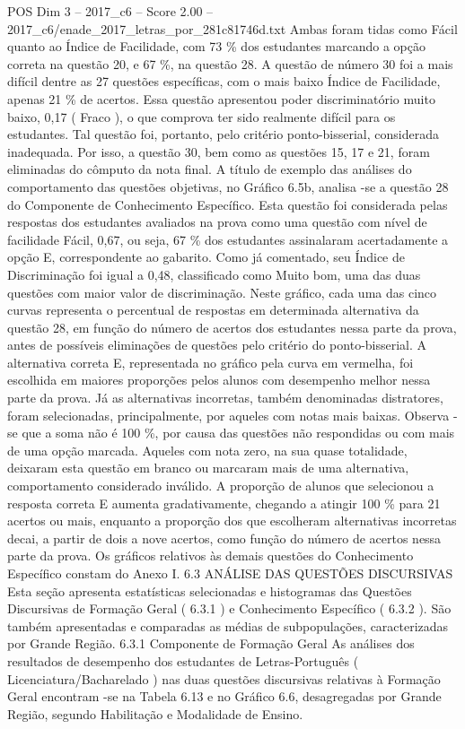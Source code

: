 \begin{textsample}{POS Dim 3 – 2017\_c6 – Score 2.00 – 2017\_c6/enade\_2017\_letras\_por\_281c81746d.txt}
Ambas foram tidas como Fácil quanto ao Índice de Facilidade, com 73 \% dos estudantes marcando a opção correta na questão 20, e 67 \%, na questão 28.
A questão de número 30 foi a mais difícil dentre as 27 questões específicas, com o mais baixo Índice de Facilidade, apenas 21 \% de acertos.
Essa questão apresentou poder discriminatório muito baixo, 0,17 ( Fraco ), o que comprova ter sido realmente difícil para os estudantes.
Tal questão foi, portanto, pelo critério ponto-bisserial, considerada inadequada.
Por isso, a questão 30, bem como as questões 15, 17 e 21, foram eliminadas do cômputo da nota final.
A título de exemplo das análises do comportamento das questões objetivas, no Gráfico 6.5b, analisa -se a questão 28 do Componente de Conhecimento Específico.
Esta questão foi considerada pelas respostas dos estudantes avaliados na prova como uma questão com nível de facilidade Fácil, 0,67, ou seja, 67 \% dos estudantes assinalaram acertadamente a opção E, correspondente ao gabarito.
Como já comentado, seu Índice de Discriminação foi igual a 0,48, classificado como Muito bom, uma das duas questões com maior valor de discriminação.
Neste gráfico, cada uma das cinco curvas representa o percentual de respostas em determinada alternativa da questão 28, em função do número de acertos dos estudantes nessa parte da prova, antes de possíveis eliminações de questões pelo critério do ponto-bisserial.
A alternativa correta E, representada no gráfico pela curva em vermelha, foi escolhida em maiores proporções pelos alunos com desempenho melhor nessa parte da prova.
Já as alternativas incorretas, também denominadas distratores, foram selecionadas, principalmente, por aqueles com notas mais baixas.
Observa -se que a soma não é 100 \%, por causa das questões não respondidas ou com mais de uma opção marcada.
Aqueles com nota zero, na sua quase totalidade, deixaram esta questão em branco ou marcaram mais de uma alternativa, comportamento considerado inválido.
A proporção de alunos que selecionou a resposta correta E aumenta gradativamente, chegando a atingir 100 \% para 21 acertos ou mais, enquanto a proporção dos que escolheram alternativas incorretas decai, a partir de dois a nove acertos, como função do número de acertos nessa parte da prova.
Os gráficos relativos às demais questões do Conhecimento Específico constam do Anexo I. 6.3 ANÁLISE DAS QUESTÕES DISCURSIVAS Esta seção apresenta estatísticas selecionadas e histogramas das Questões Discursivas de Formação Geral ( 6.3.1 ) e Conhecimento Específico ( 6.3.2 ).
São também apresentadas e comparadas as médias de subpopulações, caracterizadas por Grande Região. 6.3.1 Componente de Formação Geral As análises dos resultados de desempenho dos estudantes de Letras-Português ( Licenciatura/Bacharelado ) nas duas questões discursivas relativas à Formação Geral encontram -se na Tabela 6.13 e no Gráfico 6.6, desagregadas por Grande Região, segundo Habilitação e Modalidade de Ensino.

\end{textsample}
